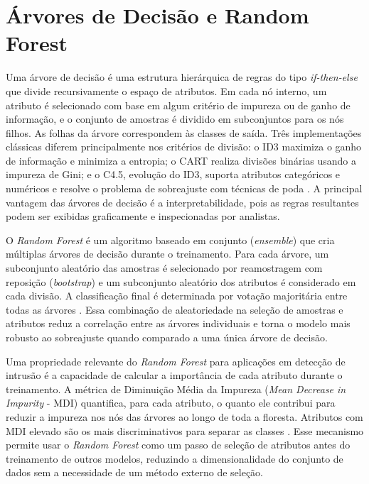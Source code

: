 \section{Árvores de Decisão e Random Forest}

Uma árvore de decisão é uma estrutura hierárquica de regras do tipo \textit{if-then-else} que divide recursivamente o espaço de atributos. Em cada nó interno, um atributo é selecionado com base em algum critério de impureza ou de ganho de informação, e o conjunto de amostras é dividido em subconjuntos para os nós filhos. As folhas da árvore correspondem às classes de saída. Três implementações clássicas diferem principalmente nos critérios de divisão: o ID3 maximiza o ganho de informação e minimiza a entropia; o CART realiza divisões binárias usando a impureza de Gini; e o C4.5, evolução do ID3, suporta atributos categóricos e numéricos e resolve o problema de sobreajuste com técnicas de poda \cite{sbrc_minicursos}. A principal vantagem das árvores de decisão é a interpretabilidade, pois as regras resultantes podem ser exibidas graficamente e inspecionadas por analistas.

O \textit{Random Forest} é um algoritmo baseado em conjunto (\textit{ensemble}) que cria múltiplas árvores de decisão durante o treinamento. Para cada árvore, um subconjunto aleatório das amostras é selecionado por reamostragem com reposição (\textit{bootstrap}) e um subconjunto aleatório dos atributos é considerado em cada divisão. A classificação final é determinada por votação majoritária entre todas as árvores \cite{santos2023ercemapi}. Essa combinação de aleatoriedade na seleção de amostras e atributos reduz a correlação entre as árvores individuais e torna o modelo mais robusto ao sobreajuste quando comparado a uma única árvore de decisão.

Uma propriedade relevante do \textit{Random Forest} para aplicações em detecção de intrusão é a capacidade de calcular a importância de cada atributo durante o treinamento. A métrica de Diminuição Média da Impureza (\textit{Mean Decrease in Impurity} - MDI) quantifica, para cada atributo, o quanto ele contribui para reduzir a impureza nos nós das árvores ao longo de toda a floresta. Atributos com MDI elevado são os mais discriminativos para separar as classes \cite{sbrc_minicursos}. Esse mecanismo permite usar o \textit{Random Forest} como um passo de seleção de atributos antes do treinamento de outros modelos, reduzindo a dimensionalidade do conjunto de dados sem a necessidade de um método externo de seleção.

